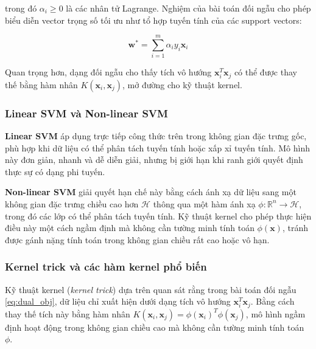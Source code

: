 \noindent trong đó $\alpha_i \geq 0$ là các nhân tử Lagrange. Nghiệm của bài toán đối ngẫu cho phép biểu diễn vector trọng số tối ưu như tổ hợp tuyến tính của các support vectors:

\begin{equation}
  \mathbf{w}^* = \sum_{i=1}^{m} \alpha_i y_i \mathbf{x}_i
  \label{eq:w_star}
\end{equation}

\noindent Quan trọng hơn, dạng đối ngẫu cho thấy tích vô hướng $\mathbf{x}_i^T \mathbf{x}_j$ có thể được thay thế bằng hàm nhân $K(\mathbf{x}_i, \mathbf{x}_j)$, mở đường cho kỹ thuật kernel.

\subsubsection{Linear SVM và Non-linear SVM}

\textbf{Linear SVM} áp dụng trực tiếp công thức trên trong không gian đặc trưng gốc, phù hợp khi dữ liệu có thể phân tách tuyến tính hoặc xấp xỉ tuyến tính. Mô hình này đơn giản, nhanh và dễ diễn giải, nhưng bị giới hạn khi ranh giới quyết định thực sự có dạng phi tuyến.

\textbf{Non-linear SVM} giải quyết hạn chế này bằng cách ánh xạ dữ liệu sang một không gian đặc trưng chiều cao hơn $\mathcal{H}$ thông qua một hàm ánh xạ $\phi: \mathbb{R}^n \to \mathcal{H}$, trong đó các lớp có thể phân tách tuyến tính. Kỹ thuật kernel cho phép thực hiện điều này một cách ngầm định mà không cần tường minh tính toán $\phi(\mathbf{x})$, tránh được gánh nặng tính toán trong không gian chiều rất cao hoặc vô hạn.

\subsubsection{Kernel trick và các hàm kernel phổ biến}

Kỹ thuật kernel (\textit{kernel trick}) dựa trên quan sát rằng trong bài toán đối ngẫu \eqref{eq:dual_obj}, dữ liệu chỉ xuất hiện dưới dạng tích vô hướng $\mathbf{x}_i^T \mathbf{x}_j$. Bằng cách thay thế tích này bằng hàm nhân $K(\mathbf{x}_i, \mathbf{x}_j) = \phi(\mathbf{x}_i)^T \phi(\mathbf{x}_j)$, mô hình ngầm định hoạt động trong không gian chiều cao mà không cần tường minh tính toán $\phi$.

